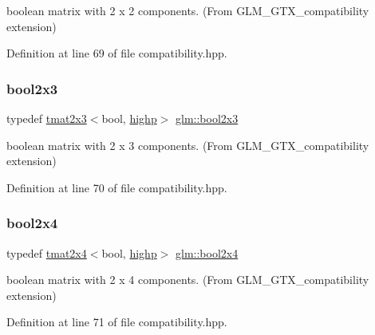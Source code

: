 boolean matrix with 2 x 2 components. (From G\+L\+M\+\_\+\+G\+T\+X\+\_\+compatibility extension) 



Definition at line 69 of file compatibility.\+hpp.

\mbox{\label{group__gtx__compatibility_ga2d7e2c79179868a41d1f9f7a63f2ae52}} 
\subsubsection{\texorpdfstring{bool2x3}{bool2x3}}
{\footnotesize\ttfamily typedef \mbox{\hyperlink{structglm_1_1tmat2x3}{tmat2x3}}$<$bool, \mbox{\hyperlink{namespaceglm_a0f04f086094c747d227af4425893f545ac6f7eab42eacbb10d59a58e95e362074}{highp}}$>$ \mbox{\hyperlink{group__gtx__compatibility_ga2d7e2c79179868a41d1f9f7a63f2ae52}{glm\+::bool2x3}}}



boolean matrix with 2 x 3 components. (From G\+L\+M\+\_\+\+G\+T\+X\+\_\+compatibility extension) 



Definition at line 70 of file compatibility.\+hpp.

\mbox{\label{group__gtx__compatibility_gacbd1c62dfad23155dba803d7c5125288}} 
\subsubsection{\texorpdfstring{bool2x4}{bool2x4}}
{\footnotesize\ttfamily typedef \mbox{\hyperlink{structglm_1_1tmat2x4}{tmat2x4}}$<$bool, \mbox{\hyperlink{namespaceglm_a0f04f086094c747d227af4425893f545ac6f7eab42eacbb10d59a58e95e362074}{highp}}$>$ \mbox{\hyperlink{group__gtx__compatibility_gacbd1c62dfad23155dba803d7c5125288}{glm\+::bool2x4}}}



boolean matrix with 2 x 4 components. (From G\+L\+M\+\_\+\+G\+T\+X\+\_\+compatibility extension) 



Definition at line 71 of file compatibility.\+hpp.


